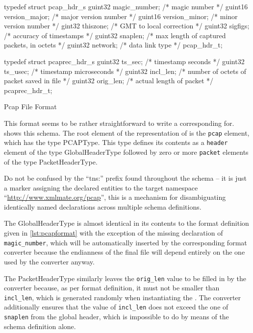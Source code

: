 \begin{listing}[htb]
\centering
\begin{cppcode}
typedef struct pcap_hdr_s {
        guint32 magic_number;   /* magic number */
        guint16 version_major;  /* major version number */
        guint16 version_minor;  /* minor version number */
        gint32  thiszone;       /* GMT to local correction */
        guint32 sigfigs;        /* accuracy of timestamps */
        guint32 snaplen;        /* max length of captured packets, in octets */
        guint32 network;        /* data link type */
} pcap_hdr_t;

typedef struct pcaprec_hdr_s {
        guint32 ts_sec;         /* timestamp seconds */
        guint32 ts_usec;        /* timestamp microseconds */
        guint32 incl_len;       /* number of octets of packet saved in file */
        guint32 orig_len;       /* actual length of packet */
} pcaprec_hdr_t;
\end{cppcode}
\caption{Pcap File Format}
\label{lst:pcapformat}
\end{listing}

This format seems to be rather straightforward to write a corresponding \xsd for.  shows
this schema. The root element of the \xml representation of \pcap is the \texttt{pcap} element, which has the
type PCAPType. This type defines its contents as a \texttt{header} element of the type GlobalHeaderType
followed by zero or more \texttt{packet} elements of the type PacketHeaderType. 

Do not be confused by the ``tns:'' prefix found throughout the schema -- it is just a marker assigning the
declared entities to the target namespace ``\url{http://www.xmlmate.org/pcap}'', this is a mechanism for
disambiguating identically named declarations across multiple schema definitions. 

The GlobalHeaderType is almost identical in its contents to the format definition given in
\cref{lst:pcapformat} with the exception of the missing declaration of \texttt{magic\_number}, which will be
automatically inserted by the corresponding format converter because the endianness of the final \pcap file
will depend entirely on the one used by the converter anyway.

The PacketHeaderType similarly leaves the \texttt{orig\_len} value to be filled in by the converter because, as
per format definition, it must not be smaller than \texttt{incl\_len}, which is generated randomly when
instantiating the \xml. The converter additionally ensures that the value of \texttt{incl\_len} does not exceed
the one of \texttt{snaplen} from the global header, which is impossible to do by means of the schema
definition alone.

